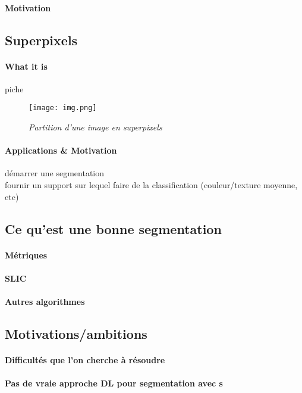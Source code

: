\documentclass{article}
\begin{document}
\paragraph{Motivation}

\subsection{Superpixels}
\paragraph{What it is}piche

\begin{figure}[!htb]
    \centering
    \texttt{[image: img.png]}
    \caption{\textit{Partition d'une image en superpixels}}
    \label{fig:spp}
\end{figure}

\paragraph{Applications \& Motivation}
démarrer une segmentation\\
fournir un support sur lequel faire de la classification (couleur/texture moyenne, etc)


\subsection{Ce qu'est une bonne \spp segmentation}
\paragraph{Métriques}
\paragraph{SLIC}
\paragraph{Autres algorithmes}

\subsection{Motivations/ambitions}
\paragraph{Difficultés que l'on cherche à résoudre}
\paragraph{Pas de vraie approche DL pour segmentation avec \spp s}
\end{document}
